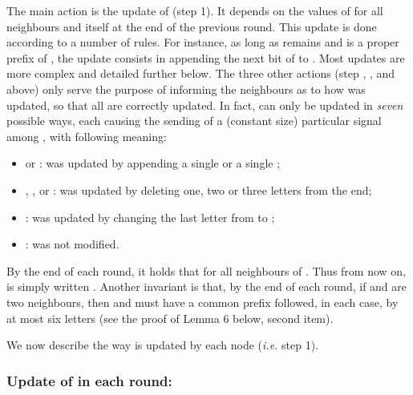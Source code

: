 \documentclass[11pt,envcountsame,letterpaper]{llncs}
\begin{document}
\noindent
The main action is the update of  (step 1).
It depends on the values of   for all neighbours  and 
  itself at the end of the previous round. 
This update is done according to a number of rules. For instance, as long as  remains  and  is a proper prefix of , the update consists in appending the next bit of  to . Most updates are more complex and detailed further below. The three other actions (step , , and  above) only serve the purpose of informing the neighbours as to how  was updated, so that all   are correctly updated. In fact,  can only be updated in {\em seven} possible ways, each causing the sending of a (constant size) particular signal among , with following meaning:
\begin{itemize}
\item  or :  was updated by appending a single  or a single ;
\item , , or :  was updated by deleting one, two or three letters from the end;
\item :  was updated by changing the last letter from  to ;
\item :  was not modified.
\end{itemize}


By the end of each round, it holds that  for all neighbours  of .
Thus from now on,   is simply written . Another invariant is that, by the end of each round, if  and  are two neighbours, then  and  must have a common prefix followed, in each case, by at most six letters (see the proof of Lemma 6 below, second item).

We now describe the way  is updated by each node  ({\it i.e.} step 1).
 
\subsubsection{Update of  in each round:}
\end{document}

